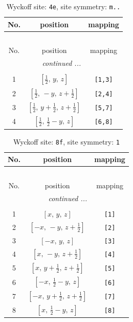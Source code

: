 \documentclass[fleqn,8pt]{jsarticle}
\begin{document}
\renewcommand{\arraystretch}{1.2}
\begin{longtable}{ccc}
\caption{Wyckoff site: {\tt 4e}, site symmetry: {\tt m..}}
 \\
 \hline \hline
No. & position & mapping \\ \hline \endfirsthead

\multicolumn{2}{l}{\tablename\ \thetable{}} \\
 \hline \hline
No. & position & mapping \\ \hline \endhead

 \hline \hline
\multicolumn{2}{r}{\footnotesize\it continued ...} \\ \endfoot

 \hline \hline
\multicolumn{2}{r}{} \\ \endlastfoot

1 & $\left[ \frac{1}{2},\, y,\, z \right]$ & {\tt [1,3]} \\ \hline
2 & $\left[ \frac{1}{2},\, - y,\, z + \frac{1}{2} \right]$ & {\tt [2,4]} \\ \hline
3 & $\left[ \frac{1}{2},\, y + \frac{1}{2},\, z + \frac{1}{2} \right]$ & {\tt [5,7]} \\ \hline
4 & $\left[ \frac{1}{2},\, \frac{1}{2} - y,\, z \right]$ & {\tt [6,8]} \\
\end{longtable}
\renewcommand{\arraystretch}{1.2}
\begin{longtable}{ccc}
\caption{Wyckoff site: {\tt 8f}, site symmetry: {\tt 1}}
 \\
 \hline \hline
No. & position & mapping \\ \hline \endfirsthead

\multicolumn{2}{l}{\tablename\ \thetable{}} \\
 \hline \hline
No. & position & mapping \\ \hline \endhead

 \hline \hline
\multicolumn{2}{r}{\footnotesize\it continued ...} \\ \endfoot

 \hline \hline
\multicolumn{2}{r}{} \\ \endlastfoot

1 & $\left[ x,\, y,\, z \right]$ & {\tt [1]} \\ \hline
2 & $\left[ - x,\, - y,\, z + \frac{1}{2} \right]$ & {\tt [2]} \\ \hline
3 & $\left[ - x,\, y,\, z \right]$ & {\tt [3]} \\ \hline
4 & $\left[ x,\, - y,\, z + \frac{1}{2} \right]$ & {\tt [4]} \\ \hline
5 & $\left[ x,\, y + \frac{1}{2},\, z + \frac{1}{2} \right]$ & {\tt [5]} \\ \hline
6 & $\left[ - x,\, \frac{1}{2} - y,\, z \right]$ & {\tt [6]} \\ \hline
7 & $\left[ - x,\, y + \frac{1}{2},\, z + \frac{1}{2} \right]$ & {\tt [7]} \\ \hline
8 & $\left[ x,\, \frac{1}{2} - y,\, z \right]$ & {\tt [8]} \\
\end{longtable}
\end{document}
